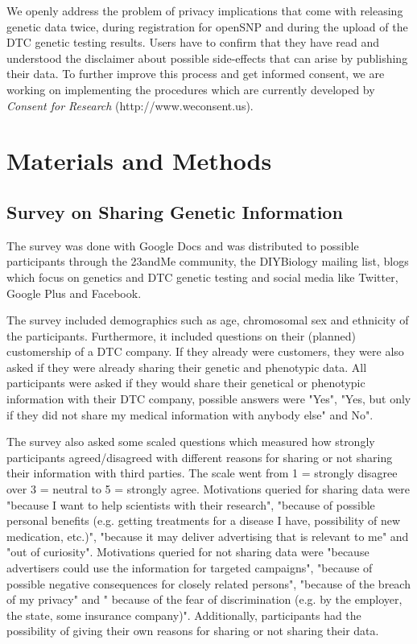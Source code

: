 \documentclass[10pt]{article}
\begin{document}
We openly address the problem of privacy implications that come with releasing genetic data twice, during registration for openSNP and during the upload of the DTC genetic testing results. Users have to confirm that they have read and understood the disclaimer about possible side-effects that can arise by publishing their data. To further improve this process and get informed consent, we are working on implementing the procedures which are currently developed by \textit{Consent for Research} (http://www.weconsent.us).
 
\section*{Materials and Methods}
\subsection*{Survey on Sharing Genetic Information}
The survey was done with Google Docs and was distributed to possible participants through the 23andMe community, the DIYBiology mailing list, blogs which focus on genetics and DTC genetic testing and social media like Twitter, Google Plus and Facebook.  

The survey included demographics such as age, chromosomal sex and ethnicity of the participants. Furthermore, it included questions on their (planned) customership of a DTC company. If they already were customers, they were also asked if they were already sharing their genetic and phenotypic data. All participants were asked if they would share their genetical or phenotypic information with their DTC company, possible answers were "Yes", "Yes, but only if they did not share my medical information with anybody else" and No".

The survey also asked some scaled questions which measured how strongly participants agreed/disagreed with different reasons for sharing or not sharing their information with third parties. The scale went from 1 = strongly disagree over 3 = neutral to  5 = strongly agree. Motivations queried for sharing data were "because I want to help scientists with their research", "because of possible personal benefits (e.g. getting treatments for a disease I have, possibility of new medication, etc.)", "because it may deliver advertising that is relevant to me" and "out of curiosity". Motivations queried for not sharing data were "because advertisers could use the information for targeted campaigns", "because of possible negative consequences for closely related persons", "because of the breach of my privacy" and " because of the fear of discrimination (e.g. by the employer, the state, some insurance company)". Additionally, participants had the possibility of giving their own reasons for sharing or not sharing their data.
\end{document}
